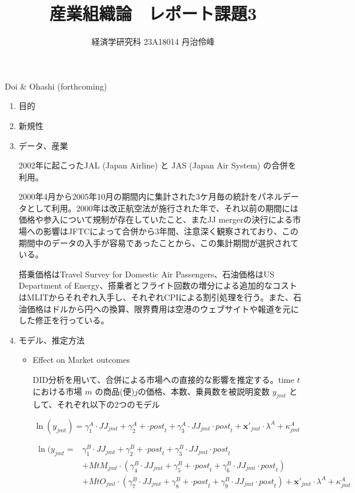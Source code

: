 \documentclass{jsarticle}
\begin{document}
\title{産業組織論　レポート課題3}
\author{経済学研究科 23A18014 丹治伶峰}
\date{}
\maketitle

Doi \& Ohashi (forthcoming)

\begin{enumerate}

\item 目的

\item 新規性

\item データ、産業

2002年に起こったJAL (Japan Airline) と JAS (Japan Air System) の合併を利用。

2000年4月から2005年10月の期間内に集計された3ケ月毎の統計をパネルデータとして利用。2000年は改正航空法が施行された年で、それ以前の期間には価格や参入について規制が存在していたこと、またJJ mergerの決行による市場への影響はJFTCによって合併から3年間、注意深く観察されており、この期間中のデータの入手が容易であったことから、この集計期間が選択されている。

搭乗価格はTravel Survey for Domestic Air Passengers、石油価格はUS Department of Energy、搭乗者とフライト回数の増分による追加的なコストはMLITからそれぞれ入手し、それぞれCPIによる割引処理を行う。また、石油価格はドルから円への換算、限界費用は空港のウェブサイトや報道を元にした修正を行っている。

\item モデル、推定方法

\begin{itemize}

\item Effect on Market outcomes

DID分析を用いて、合併による市場への直接的な影響を推定する。time $t$における市場 $m$ の商品(便)$j$の価格、本数、乗員数を被説明変数 $y_{jmt}$ として、それぞれ以下の2つのモデル

\[\ln(y_{jmt})=\gamma^A_1 \cdot \textit{JJ}_{jmt} + \gamma^A_2 + \cdot \textit{post}_t +\gamma_3^A \cdot \textit{JJ}_{jmt} \cdot \textit{post}_t + \mathbf{x}'_{jmt} \cdot \lambda^A +\kappa_{jmt}^A \]

\begin{align*}
\ln(y_{jmt}= &\gamma^B_1 \cdot \textit{JJ}_{jmt} + \gamma^B_2 + \cdot \textit{post}_t +\gamma_3^B \cdot \textit{JJ}_{jmt} \cdot \textit{post}_t \\
 & + \textit{MtM}_{jmt} \cdot (\gamma^B_4 \cdot \textit{JJ}_{jmt} + \gamma^B_5 + \cdot \textit{post}_t +\gamma_6^B \cdot \textit{JJ}_{jmt} \cdot \textit{post}_t ) \\
 & +\textit{MtO}_{jmt} \cdot (\gamma^B_7 \cdot \textit{JJ}_{jmt} + \gamma^B_8 + \cdot \textit{post}_t +\gamma_9^B \cdot \textit{JJ}_{jmt} \cdot \textit{post}_t) + \mathbf{x}'_{jmt} \cdot \lambda^A +\kappa_{jmt}^A 
 \end{align*}


\end{itemize}
\end{enumerate}
\end{document}
